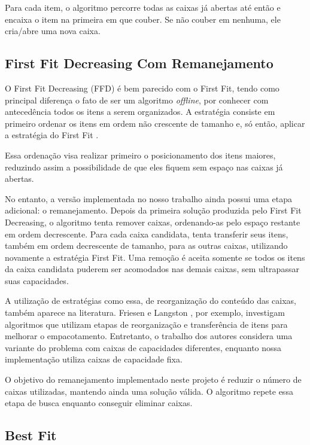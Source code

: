 \documentclass[12pt]{article}
\begin{document}
Para cada item, o algoritmo percorre todas as caixas já abertas até então e encaixa o item na primeira em que couber. Se não couber em nenhuma, ele cria/abre uma nova caixa. 

\subsection{First Fit Decreasing Com Remanejamento}

O First Fit Decreasing (FFD) é bem parecido com o First Fit, tendo como principal diferença o fato de ser um algoritmo \textit{offline}, por conhecer com antecedência todos os itens a serem organizados. A estratégia consiste em primeiro ordenar os itens em ordem não crescente de tamanho e, só então, aplicar a estratégia do First Fit \cite{ambrose2025}.

Essa ordenação visa realizar primeiro o posicionamento dos itens maiores, reduzindo assim a possibilidade de que eles fiquem sem espaço nas caixas já abertas.

No entanto, a versão implementada no nosso trabalho ainda possui uma etapa adicional: o remanejamento. Depois da primeira solução produzida pelo First Fit Decreasing, o algoritmo tenta remover caixas, ordenando-as pelo espaço restante em ordem decrescente. Para cada caixa candidata, tenta transferir seus itens, também em ordem decrescente de tamanho, para as outras caixas, utilizando novamente a estratégia First Fit. Uma remoção é aceita somente se todos os itens da caixa candidata puderem ser acomodados nas demais caixas, sem ultrapassar suas capacidades.

A utilização de estratégias como essa, de reorganização do conteúdo das caixas, também aparece na literatura. Friesen e Langston \cite{friesen1986}, por exemplo, investigam algoritmos que utilizam etapas de reorganização e transferência de itens para melhorar o empacotamento. Entretanto, o trabalho dos autores considera uma variante do problema com caixas de capacidades diferentes, enquanto nossa implementação utiliza caixas de capacidade fixa.

O objetivo do remanejamento implementado neste projeto é reduzir o número de caixas utilizadas, mantendo ainda uma solução válida. O algoritmo repete essa etapa de busca enquanto conseguir eliminar caixas.

\subsection{Best Fit}
\end{document}
